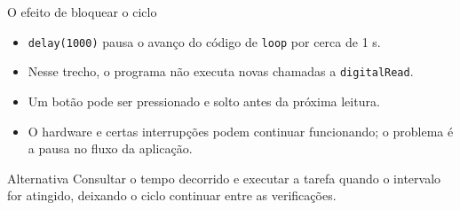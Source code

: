\begin{frame}[t]{O efeito de bloquear o ciclo}
\begin{itemize}
\item \texttt{delay(1000)} pausa o avanço do código de \texttt{loop} por cerca de 1 s.
\item Nesse trecho, o programa não executa novas chamadas a \texttt{digitalRead}.
\item Um botão pode ser pressionado e solto antes da próxima leitura.
\item O hardware e certas interrupções podem continuar funcionando; o problema é a pausa no fluxo da aplicação.
\end{itemize}
\begin{block}{Alternativa}
Consultar o tempo decorrido e executar a tarefa quando o intervalo for atingido, deixando o ciclo continuar entre as verificações.
\end{block}
\end{frame}
